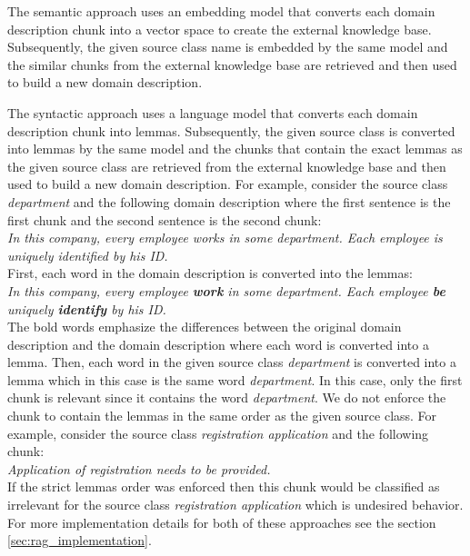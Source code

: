 The semantic approach uses an embedding model that converts each domain description chunk into a vector space to create the external knowledge base. Subsequently, the given source class name is embedded by the same model and the similar chunks from the external knowledge base are retrieved and then used to build a new domain description.

The syntactic approach uses a language model that converts each domain description chunk into lemmas. Subsequently, the given source class is converted into lemmas by the same model and the chunks that contain the exact lemmas as the given source class are retrieved from the external knowledge base and then used to build a new domain description. For example, consider the source class \textit{department} and the following domain description where the first sentence is the first chunk and the second sentence is the second chunk: \\

\noindent{}\textit{In this company, every employee works in some department. Each employee is uniquely identified by his ID.} \\

\noindent{}First, each word in the domain description is converted into the lemmas: \\

\noindent{}\textit{In this company, every employee \textbf{work} in some department. Each employee \textbf{be} uniquely \textbf{identify} by his ID.} \\

\noindent{}The bold words emphasize the differences between the original domain description and the domain description where each word is converted into a lemma. Then, each word in the given source class \textit{department} is converted into a lemma which in this case is the same word \textit{department}.  In this case, only the first chunk is relevant since it contains the word \textit{department}. We do not enforce the chunk to contain the lemmas in the same order as the given source class. For example, consider the source class \textit{registration application} and the following chunk: \\

\noindent{}\textit{Application of registration needs to be provided.} \\

\noindent{}If the strict lemmas order was enforced then this chunk would be classified as irrelevant for the source class \textit{registration application} which is undesired behavior. For more implementation details for both of these approaches see the section \ref{sec:rag_implementation}.



